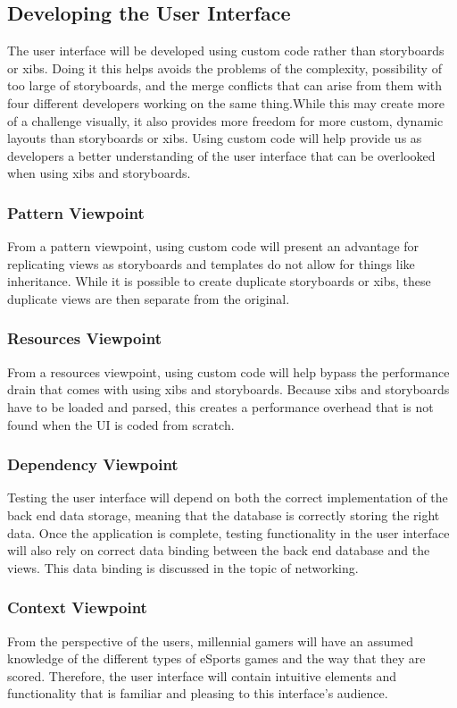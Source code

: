 \documentclass[onecolumn, draftclsnofoot,10pt, compsoc]{IEEEtran}
\begin{document}
\subsection{Developing the User Interface \cite{UI}}
The user interface will be developed using custom code rather than storyboards or xibs. Doing it this helps avoids the problems of the complexity, possibility of too large of storyboards, and the merge conflicts that can arise from them with four different developers working on the same thing.While this may create more of a challenge visually, it also provides more freedom for more custom, dynamic layouts than storyboards or xibs. Using custom code will help provide us as developers a better understanding of the user interface that can be overlooked when using xibs and storyboards.  
 \subsubsection{Pattern Viewpoint}
  From a pattern viewpoint, using custom code will present an advantage for replicating views as storyboards and templates do not allow for things like inheritance. While it is possible to create duplicate storyboards or xibs, these duplicate views are then separate from the original.
  \subsubsection{Resources Viewpoint}
  From a resources viewpoint, using custom code will help bypass the performance drain that comes with using xibs and storyboards. Because xibs and storyboards have to be loaded and parsed, this creates a performance overhead that is not found when the UI is coded from scratch. 
  \subsubsection{Dependency Viewpoint}
  Testing the user interface will depend on both the correct implementation of the back end data storage, meaning that the database is correctly storing the right data. Once the application is complete, testing functionality in the user interface will also rely on correct data binding between the back end database and the views. This data binding is discussed in the topic of networking. 
   \subsubsection{Context Viewpoint}
   From the perspective of the users, millennial gamers will have an assumed  knowledge of the different types of eSports games and the way that they are scored. Therefore, the user interface will contain intuitive elements and functionality that is familiar and pleasing to this interface's audience.
   
\end{document}
